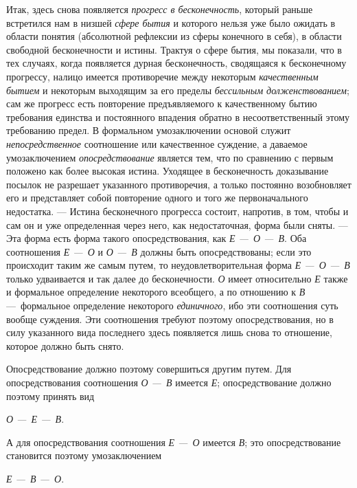 \documentclass[twoside]{article}
\begin{document}
{{{Итак, здесь снова появляется
{\em прогресс в бесконечность},
который раньше встретился нам в низшей
{\em сфере бытия} и
которого нельзя уже было ожидать в области понятия (абсолютной рефлексии из
сферы конечного в себя), в области свободной бесконечности и истины.
Трактуя о сфере бытия, мы показали, что в тех случаях, когда появляется
дурная бесконечность, сводящаяся к бесконечному прогрессу, налицо имеется
противоречие между некоторым
{\em качественным бытием}
и некоторым выходящим за его пределы
{\em бессильным долженствованием};
сам же прогресс есть повторение предъявляемого к
качественному бытию требования единства и постоянного впадения обратно в
несоответственный этому требованию предел. В формальном умозаключении
основой служит {\em непосредственное}
соотношение или качественное суждение, а даваемое
умозаключением {\em опосредствование}
является тем, что по сравнению с первым положено как более
высокая истина. Уходящее в бесконечность доказывание посылок не разрешает
указанного противоречия, а только постоянно возобновляет его и представляет
собой повторение одного и того же первоначального недостатка. —
Истина бесконечного прогресса состоит, напротив, в том, чтобы
и сам он и уже определенная через него, как недостаточная, форма были
сняты. — Эта форма есть форма такого опосредствования, как
{\em Е —~О
—~В}. Оба соотношения
{\em Е —~О}
и {\em О
—~В} должны быть опосредствованы; если это
происходит таким же самым путем, то неудовлетворительная форма
{\em Е —~О
—~В} только удваивается и так далее до
бесконечности. {\em О}
имеет относительно
{\em Е} также и
формальное определение некоторого всеобщего, а по отношению к
{\em В} —~формальное
определение некоторого
{\em единичного}, ибо эти
соотношения суть вообще суждения. Эти соотношения требуют поэтому
опосредствования, но в силу указанного вида последнего здесь появляется
лишь снова то отношение, которое должно быть снято.

Опосредствование должно поэтому совершиться другим путем. Для
опосредствования соотношения {\em О
—~В} имеется
{\em Е}; опосредствование
должно поэтому принять вид

{\centering
{\em О —~Е
—~В}.
\par}

А для опосредствования соотношения
{\em Е —~О}
имеется {\em В};
это опосредствование становится поэтому умозаключением

{\centering
{\em Е —~В
—~О}.
\par}

}}}
\end{document}
